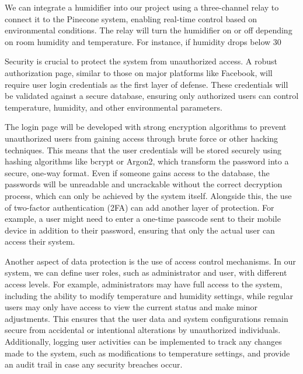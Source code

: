 \documentclass[a4paper]{scrartcl}
\begin{document}
We can integrate a humidifier into our project using a three-channel relay to connect it to the Pinecone system, enabling real-time control based on environmental conditions. The relay will turn the humidifier on or off depending on room humidity and temperature. For instance, if humidity drops below 30%

Security is crucial to protect the system from unauthorized access. A robust authorization page, similar to those on major platforms like Facebook, will require user login credentials as the first layer of defense. These credentials will be validated against a secure database, ensuring only authorized users can control temperature, humidity, and other environmental parameters.

The login page will be developed with strong encryption algorithms to prevent unauthorized users from gaining access through brute force or other hacking techniques. This means that the user credentials will be stored securely using hashing algorithms like bcrypt or Argon2, which transform the password into a secure, one-way format. Even if someone gains access to the database, the passwords will be unreadable and uncrackable without the correct decryption process, which can only be achieved by the system itself. Alongside this, the use of two-factor authentication (2FA) can add another layer of protection. For example, a user might need to enter a one-time passcode sent to their mobile device in addition to their password, ensuring that only the actual user can access their system.

Another aspect of data protection is the use of access control mechanisms. In our system, we can define user roles, such as administrator and user, with different access levels. For example, administrators may have full access to the system, including the ability to modify temperature and humidity settings, while regular users may only have access to view the current status and make minor adjustments. This ensures that the user data and system configurations remain secure from accidental or intentional alterations by unauthorized individuals. Additionally, logging user activities can be implemented to track any changes made to the system, such as modifications to temperature settings, and provide an audit trail in case any security breaches occur.
\end{document}

